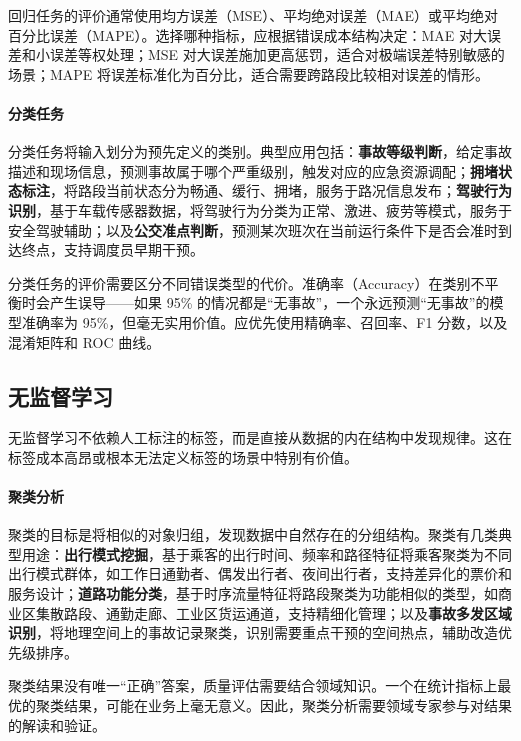回归任务的评价通常使用均方误差（MSE）、平均绝对误差（MAE）或平均绝对百分比误差（MAPE）。选择哪种指标，应根据错误成本结构决定：MAE 对大误差和小误差等权处理；MSE 对大误差施加更高惩罚，适合对极端误差特别敏感的场景；MAPE 将误差标准化为百分比，适合需要跨路段比较相对误差的情形。

\paragraph{分类任务}

分类任务将输入划分为预先定义的类别。典型应用包括：\textbf{事故等级判断}，给定事故描述和现场信息，预测事故属于哪个严重级别，触发对应的应急资源调配；\textbf{拥堵状态标注}，将路段当前状态分为畅通、缓行、拥堵，服务于路况信息发布；\textbf{驾驶行为识别}，基于车载传感器数据，将驾驶行为分类为正常、激进、疲劳等模式，服务于安全驾驶辅助；以及\textbf{公交准点判断}，预测某次班次在当前运行条件下是否会准时到达终点，支持调度员早期干预。

分类任务的评价需要区分不同错误类型的代价。准确率（Accuracy）在类别不平衡时会产生误导——如果 95\% 的情况都是“无事故”，一个永远预测“无事故”的模型准确率为 95\%，但毫无实用价值。应优先使用精确率、召回率、F1 分数，以及混淆矩阵和 ROC 曲线。

\subsection{无监督学习}

无监督学习不依赖人工标注的标签，而是直接从数据的内在结构中发现规律。这在标签成本高昂或根本无法定义标签的场景中特别有价值。

\paragraph{聚类分析}

聚类的目标是将相似的对象归组，发现数据中自然存在的分组结构。聚类有几类典型用途：\textbf{出行模式挖掘}，基于乘客的出行时间、频率和路径特征将乘客聚类为不同出行模式群体，如工作日通勤者、偶发出行者、夜间出行者，支持差异化的票价和服务设计；\textbf{道路功能分类}，基于时序流量特征将路段聚类为功能相似的类型，如商业区集散路段、通勤走廊、工业区货运通道，支持精细化管理；以及\textbf{事故多发区域识别}，将地理空间上的事故记录聚类，识别需要重点干预的空间热点，辅助改造优先级排序。

聚类结果没有唯一“正确”答案，质量评估需要结合领域知识。一个在统计指标上最优的聚类结果，可能在业务上毫无意义。因此，聚类分析需要领域专家参与对结果的解读和验证。

